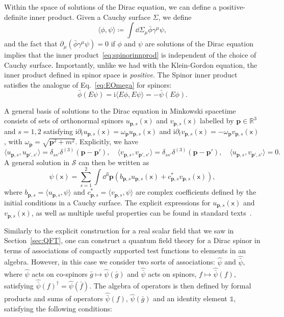 \documentclass[letterpaper,12pt,titlepage,oneside,final]{book}
\newcommand{\openone}{\mathds{1}}
\newcommand{\mf}{\mathsf}%
\newcommand{\ii}{\mathrm{i}}
\begin{document}
Within the space of solutions of the Dirac equation, we can define a positive-definite inner product. Given a Cauchy surface $\Sigma$, we define
\begin{equation}\label{eq:spinorinnprod}
    \langle \phi,\psi\rangle \coloneqq \int \dd \Sigma_\mu \bar{\phi}\gamma^\mu \psi,
\end{equation}
and the fact that $\partial_\mu(\bar{\phi}\gamma^\mu \psi) = 0$ if $\phi$ and $\psi$ are solutions of the Dirac equation implies that the inner product~\eqref{eq:spinorinnprod} is independent of the choice of Cauchy surface. Importantly, unlike we had with the Klein-Gordon equation, the inner product defined in spinor space is \textit{positive}. The Spinor inner product satisfies the analogue of Eq.~\eqref{eq:EOmega} for spinors: 
\begin{equation}
    \bar{\phi}(E \psi) = \ii \langle E \phi,E\psi\rangle = - \bar{\psi}(E\phi).
\end{equation}

A general basis of solutions to the Dirac equation in Minkowski spacetime consists of sets of orthonormal spinors $u_{\bm p,s}(\mf x)$ and $v_{\bm p, s}(\mf x)$ labelled by $\bm p \in \mathbb{R}^3$ and $s = 1,2$ satisfying $\ii \partial_t u_{\bm p,s}(\mf x) = \omega_{\bm p}u_{\bm p,s}(\mf x)$ and $\ii \partial_t v_{\bm p,s}(\mf x) = -\omega_{\bm p}v_{\bm p,s}(\mf x)$, with $\omega_{\bm p} = \sqrt{\bm p^2 + m^2}$. Explicitly, we have
\begin{equation}
    \langle u_{\bm p,s}, u_{\bm p',s'}\rangle = \delta_{ss'} \delta^{(3)}(\bm p - \bm p'), \quad \langle v_{\bm p,s}, v_{\bm p',s'}\rangle = \delta_{ss'} \delta^{(3)}(\bm p - \bm p'), \quad \langle u_{\bm p,s}, v_{\bm p',s'}\rangle = 0.
\end{equation}
A general solution in $\mathcal{S}$ can then be written as
\begin{equation}
    \psi(\mf x) = \sum_{s=1}^2 \int \dd^3 \bm p \left(b_{\bm p,s} u_{\bm p,s}(\mf x) + c_{\bm p,s}^* v_{\bm p,s}(\mf x)\right),    
\end{equation}
where $b_{\bm p,s} = \langle u_{\bm p,s},\psi\rangle$ and $c_{\bm p,s}^* = \langle v_{\bm p,s},\psi\rangle$ are complex coefficients defined by the initial conditions in a Cauchy surface. The explicit expressions for $u_{\bm p,s}(\mf x)$ and $v_{\bm p, s}(\mf x)$, as well as multiple useful properties can be found in standard texts~\cite{Peskin}.


Similarly to the explicit construction for a real scalar field that we saw in Section~\ref{sec:QFT}, one can construct a quantum field theory for a Dirac spinor in terms of associations of compactly supported test functions to elements in an algebra. However, in this case we consider two sorts of associations: $\hat{\psi}$ and $\hat{\bar{\psi}}$, where $\hat{\psi}$ acts on co-spinors $\bar{g}\mapsto \hat{\psi}(\bar{g})$ and $\hat{\bar{\psi}}$ acts on spinors, $f\mapsto \hat{\bar{\psi}}(f)$, satisfying $\hat{\bar{\psi}}(f)^\dagger = \hat{\psi}(\bar{f})$. The algebra of operators is then defined by formal products and sums of operators $\hat{\bar{\psi}}(f)$, $\hat{\psi}(\bar{g})$ and an identity element $\openone$, satisfying the following conditions:
\end{document}
